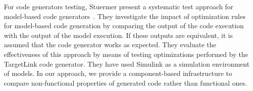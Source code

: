 For code generators testing, Stuermer \etal present a systematic test approach for model-based code generators~\cite{stuermer2007systematic}. They investigate the impact of optimization rules for model-based code generation by comparing the output of the code execution with the output of the model execution. 
If these outputs are equivalent, it is assumed that the code generator works as expected. 
They evaluate the effectiveness of this approach by means of testing optimizations performed by the TargetLink code generator. 
They have used Simulink as a simulation environment of models. 
In our approach, we provide a component-based infrastructure to compare non-functional properties of generated code rather than functional ones. 
\fi
